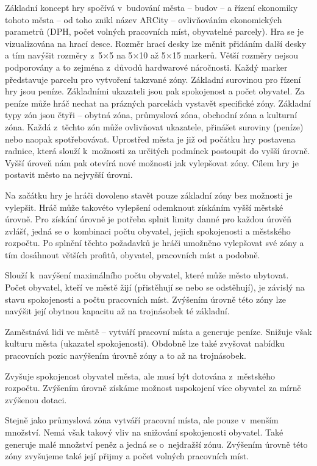 \documentclass[twoside,12pt]{article}
\begin{document}
Základní koncept hry spočívá v~budování města -- budov -- a řízení ekonomiky tohoto města -- od toho znikl název ARCity -- ovlivňováním ekonomických parametrů (DPH, počet volných pracovních míst, obyvatelné parcely). Hra se je vizualizována na hrací desce. Rozměr hrací desky lze měnit přidáním další desky a tím navýšit rozměry z~5$\times$5 na 5$\times$10 až 5$\times$15 markerů. Větší rozměry nejsou podporovány a to zejména z~důvodů hardwarové náročnosti. Každý marker představuje parcelu pro vytvoření takzvané zóny. Základní surovinou pro řízení hry jsou peníze. Základními ukazateli jsou pak spokojenost a počet obyvatel.  Za peníze může hráč nechat na prázných parcelách vystavět specifické zóny. Základní typy zón jsou čtyři -- obytná zóna, průmyslová zóna, obchodní zóna a kulturní zóna. Každá z~těchto zón může ovlivňovat ukazatele, přinášet suroviny (peníze) nebo naopak spotřebovávat. Uprostřed města je již od počátku hry postavena radnice, která slouží k~možnosti za určitých podmínek postoupit do vyšší úrovně. Vyšší úroveň nám pak otevírá nové možnosti jak vylepšovat zóny. Cílem hry je postavit město na nejvyšší úrovni. 

Na začátku hry je hráči dovoleno stavět pouze základní zóny bez možnosti je vylepšit. Hráč může takovéto vylepšení odemknout získáním vyšší městské úrovně. Pro získání úrovně je potřeba splnit limity danné pro každou úrověň zvlášť, jedná se o~kombinaci počtu obyvatel, jejich spokojenosti a městského rozpočtu. Po splnění těchto požadavků je hráči umožněno vylepšovat své zóny a tím dosáhnout větších profitů, obyvatel, pracovních míst a podobně.

Slouží k~navýšení maximálního počtu obyvatel, které může město ubytovat. Počet obyvatel, kteří ve městě žijí (přistěhují se nebo se odstěhují), je závislý na stavu spokojenosti a počtu pracovních míst. Zvýšením úrovně této zóny lze navýšit její obytnou kapacitu až na trojnásobek té základní.

Zaměstnává lidi ve městě -- vytváří pracovní místa a generuje peníze. Snižuje však kulturu města (ukazatel spokojenosti). Obdobně lze také zvyšovat nabídku pracovních pozic navýšením úrovně zóny a to až na trojnásobek.

Zvyšuje spokojenost obyvatel města, ale musí být dotována z~městského rozpočtu. Zvýšením úrovně získáme možnost uspokojení více obyvatel za mírně zvýšenou dotaci.

Stejně jako průmyslová zóna vytváří pracovní místa, ale pouze v~menším množství. Nemá však takový vliv na snižování spokojenosti obyvatel. Také generuje malé množství peněz a jedná se o~nejdražší zónu. Zvýšením úrovně této zóny zvyšujeme také její přijmy a počet volných pracovních míst. 
\end{document}
